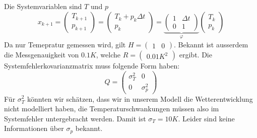 Die Systemvariablen sind $T$ und $p$
\[
x_{k+1} = \begin{pmatrix}T_{k+1} \\ p_{k+1} \end{pmatrix} = \begin{pmatrix}T_{k} + p_{k}\Delta t \\ p_k \end{pmatrix} = \underbrace{\begin{pmatrix}1 & \Delta t \\ 0 & 1 \end{pmatrix}}_{\varphi}\begin{pmatrix}T_k \\ p_k \end{pmatrix}
\]
Da nur Temepratur gemessen wird, gilt $H = \begin{pmatrix} 1 & 0 \end{pmatrix}$. Bekannt ist ausserdem die Messgenauigkeit von $0.1K$, welche $R = \begin{pmatrix}0.01K^2\end{pmatrix}$ ergibt. Die Systemfehlerkovarianzmatrix muss folgende Form haben:
\[
Q = \begin{pmatrix}\sigma_T^2 & 0 \\ 0 & \sigma_p^2 \end{pmatrix}
\]
Für $\sigma_T^2$ könnten wir schätzen, dass wir in unserem Modell die Wetterentwicklung nicht modelliert haben, die Temperaturschwankungen müssen also im Systemfehler untergebracht werden. Damit ist $\sigma_T = 10K$. Leider sind keine Informationen über $\sigma_p$ bekannt.